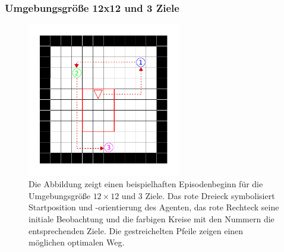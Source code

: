 \subsubsection{Umgebungsgröße 12x12 und 3 Ziele}

\begin{figure}[ht!]
  \centering
  \includegraphics[keepaspectratio,width=0.6\textwidth]{abbildungen/12x12_ep_start.pdf}
  \caption{Die Abbildung zeigt einen beispielhaften Episodenbeginn für die Umgebungsgröße $12 \times 12$ und 3 Ziele. Das rote Dreieck symbolisiert Startposition und -orientierung des Agenten, das rote Rechteck seine initiale Beobachtung und die farbigen Kreise mit den Nummern die entsprechenden Ziele. Die gestreichelten Pfeile zeigen einen möglichen optimalen Weg.}
  \label{fig_12x12_ep_start}
\end{figure}

